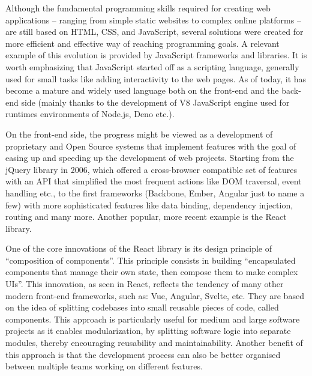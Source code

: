 Although the fundamental programming skills required for creating web applications – ranging from simple static websites to complex online platforms – are still based on HTML, CSS, and JavaScript, several solutions were created for more efficient and effective way of reaching programming goals. A relevant example of this evolution is provided by JavaScript frameworks and libraries. It is worth emphasizing that JavaScript started off as a scripting language, generally used for small tasks like adding interactivity to the web pages. As of today, it has become a mature and widely used language both on the front-end and the back-end side (mainly thanks to the development of V8 JavaScript engine used for runtimes environments of Node.js, Deno etc.).

On the front-end side, the progress might be viewed as a development of proprietary and Open Source systems that implement features with the goal of easing up and speeding up the development of web projects. Starting from the jQuery library in 2006, which offered a cross-browser compatible set of features with an API that simplified the most frequent actions like DOM traversal, event handling etc., to the first frameworks (Backbone, Ember, Angular just to name a few) with more sophisticated features like data binding, dependency injection, routing and many more. Another popular, more recent example is the React library.

One of the core innovations of the React library is its design principle of “composition of components”. This principle consists in building “encapsulated components that manage their own state, then compose them to make complex UIs”. This innovation, as seen in React, reflects the tendency of many other modern front-end frameworks, such as: Vue, Angular, Svelte, etc. They are based on the idea of splitting codebases into small reusable pieces of code, called components. This approach is particularly useful for medium and large software projects as it enables modularization, by splitting software logic into separate modules, thereby encouraging reusability and maintainability. Another benefit of this approach is that the development process can also be better organised between multiple teams working on different features. 

